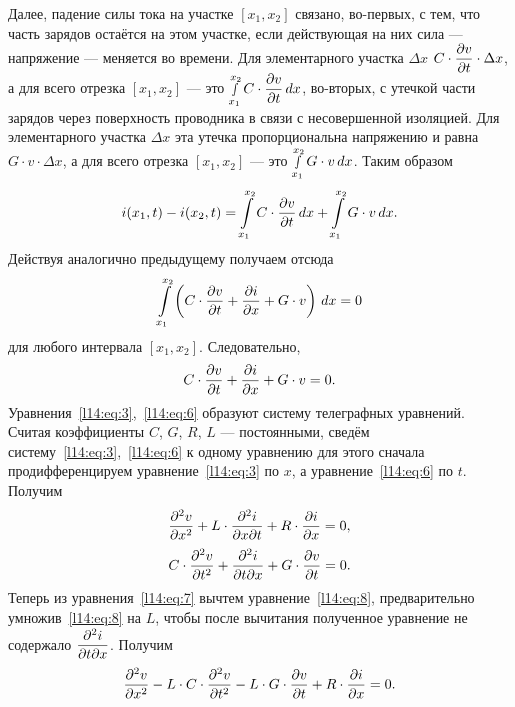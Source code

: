 Далее, падение силы тока на участке $[x_1,x_2]$ связано, во-первых, с тем, что часть зарядов остаётся на этом участке, если действующая на них сила --- напряжение --- меняется во времени. Для элементарного участка $\Delta x$ $\displaystyle C\cdot\frac{\partial v}{\partial t}\cdot\Delta x$, а для всего отрезка $[x_1,x_2]$ --- это $\displaystyle\smallint\limits_{x_1}^{x_2}C\cdot\frac{\partial v}{\partial t}\,dx$,	во-вторых, с утечкой части зарядов через поверхность проводника в связи с несовершенной изоляцией. Для элементарного участка $\Delta x$ эта утечка пропорциональна напряжению и равна $G\cdot v\cdot\Delta x$, а для всего отрезка $[x_1,x_2]$ --- это $\displaystyle\smallint\limits_{x_1}^{x_2}G\cdot v\,dx$.
Таким образом 
\begin{equation}\label{l14:eq:4}
	\hfill i(x_1,t)-i(x_2,t)=\int\limits_{x_1}^{x_2}C\cdot\pder{v}{t}\,dx+\int\limits_{x_1}^{x_2}G\cdot v\,dx.\hfill
\end{equation} 
Действуя аналогично предыдущему получаем отсюда
\begin{equation}\label{l14:eq:5}
	\hfill \int\limits_{x_1}^{x_2}\left(C\cdot\pder{v}{t}+\pder{i}{x}+G\cdot v\right)\,dx=0\hfill
\end{equation} 
для любого интервала $[x_1,x_2]$. Следовательно,
\begin{equation}\label{l14:eq:6}
	\hfill C\cdot\pder{v}{t}+\pder{i}{x}+G\cdot v=0.\hfill
\end{equation}  
Уравнения~\eqref{l14:eq:3},~\eqref{l14:eq:6} образуют систему телеграфных уравнений. Считая коэффициенты $C$, $G$, $R$, $L$ --- постоянными, сведём систему~\eqref{l14:eq:3},~\eqref{l14:eq:6} к одному уравнению для этого сначала продифференцируем уравнение~\eqref{l14:eq:3} по $x$, а уравнение~\eqref{l14:eq:6} по $t$. Получим 
\begin{equation}\label{l14:eq:7}
	\hfill \pdder{v}{x}+L\cdot\pder{^2i}{x\partial t}+R\cdot \pder{i}{x}=0,\hfill
\end{equation}
\begin{equation}\label{l14:eq:8}
	\hfill C\cdot\pdder{v}{t}+\pder{^2i}{t\partial x}+G\cdot \pder{v}{t}=0.\hfill
\end{equation} 
Теперь из уравнения~\eqref{l14:eq:7} вычтем уравнение~\eqref{l14:eq:8}, предварительно умножив~\eqref{l14:eq:8} на $L$, чтобы после вычитания полученное уравнение не содержало $\displaystyle\frac{\partial^2i}{\partial t\partial x}$. Получим
\begin{equation}\label{l14:eq:9}
	\hfill \pdder{v}{x}-L\cdot C\cdot\pdder{v}{t}-L\cdot G\cdot \pder{v}{t}+R\cdot \pder{i}{x}=0.\hfill
\end{equation} 
